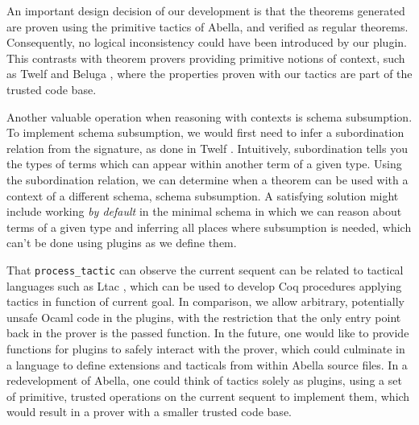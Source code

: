 \documentclass[nocopyrightspace,authoryear]{sigplanconf}
\begin{document}

An important design decision of our development is that the theorems generated are proven using the primitive tactics of Abella, and verified as regular theorems. Consequently, no logical inconsistency could have been introduced by our plugin. This contrasts with theorem provers providing primitive notions of context, such as Twelf \cite{twelfsys} and Beluga \cite{belugasys}, where the properties proven with our tactics are part of the trusted code base.

Another valuable operation when reasoning with contexts is schema subsumption. To implement schema subsumption, we would first need to infer a subordination relation from the signature, as done in Twelf \cite{twelfsys}. Intuitively, subordination tells you the types of terms which can appear within another term of a given type. Using the subordination relation, we can determine when a theorem can be used with a context of a different schema, schema subsumption. A satisfying solution might include working \emph{by default} in the minimal schema in which we can reason about terms of a given type and inferring all places where subsumption is needed, which can't be done using plugins as we define them.


 That \lstinline|process_tactic| can observe the current sequent can be related to tactical languages such as Ltac \cite{ltacpap}, which can be used to develop Coq procedures applying tactics in function of current goal. In comparison, we allow arbitrary, potentially unsafe Ocaml code in the plugins, with the restriction that the only entry point back in the prover is the passed function. In the future, one would like to provide functions for plugins to safely interact with the prover, which could culminate in a language to define extensions and tacticals from within Abella source files. In a redevelopment of Abella, one could think of tactics solely as plugins, using a set of primitive, trusted operations on the current sequent to implement them, which would result in a prover with a smaller trusted code base.




 

 
\end{document}
